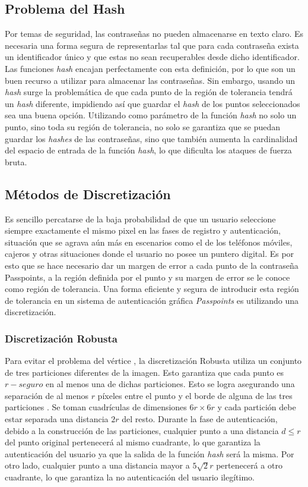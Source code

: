 \subsection{Problema del Hash}
Por temas de seguridad, las contraseñas no pueden almacenarse en texto claro. Es necesaria una forma segura de representarlas tal que para cada contraseña exista un identificador único y que estas no sean recuperables desde dicho identificador. Las funciones \textit{hash} \cite{legon2019nuevo, borrego2018debilidades} encajan perfectamente con esta definición, por lo que son un buen recurso a utilizar para almacenar las contraseñas. Sin embargo, usando un \textit{hash} surge la problemática de que cada punto de la región de tolerancia tendrá un \textit{hash} diferente, impidiendo así que guardar el \textit{hash} de los puntos seleccionados sea una buena opción. Utilizando como parámetro de la función \textit{hash} no solo un punto, sino toda su región de tolerancia, no solo se garantiza que se puedan guardar los \textit{hashes} de las contraseñas, sino que también aumenta la cardinalidad del espacio de entrada de la función \textit{hash}, lo que dificulta los ataques de fuerza bruta.
	
\subsection{M\'etodos de Discretizaci\'on}	
Es sencillo percatarse de la baja probabilidad de que un usuario seleccione siempre exactamente el mismo pixel en las fases de registro y autenticación, situación que se agrava aún más en escenarios como el de los teléfonos móviles, cajeros y otras situaciones donde el usuario no posee un puntero digital. Es por  esto que se hace necesario dar un margen de error a cada punto de la contraseña Passpoints, a la región definida por el punto y su margen de error se le conoce como región de tolerancia. Una forma eficiente y segura de introducir esta región de tolerancia en un sistema de autenticación gráfica \textit{Passpoints} es utilizando una discretización.
\subsubsection{Discretización Robusta}

Para evitar el problema del vértice \cite{birget2006graphical}, la discretizaci\'on Robusta utiliza un conjunto de tres particiones diferentes de la imagen. Esto garantiza que cada punto es $r-seguro$ en al menos una de dichas particiones. Esto se logra asegurando una separación de al menos $r$ píxeles entre el punto y el borde de alguna de las tres particiones \cite{zhu2013security, chiasson2008centered}. Se toman cuadrículas de dimensiones \(6r \times 6r\) y cada partición debe estar separada una distancia \(2r\) del resto. Durante la fase de autenticación, debido a la construcción de las particiones, cualquier punto a una distancia \(d \leq r\) del punto original pertenecerá al mismo cuadrante, lo que garantiza la autenticación del usuario ya que la salida de la función \textit{hash} será la misma. Por otro lado, cualquier punto a una distancia mayor a \(5\sqrt{2}r\) pertenecerá a otro cuadrante, lo que garantiza la no autenticación del usuario ilegítimo.

